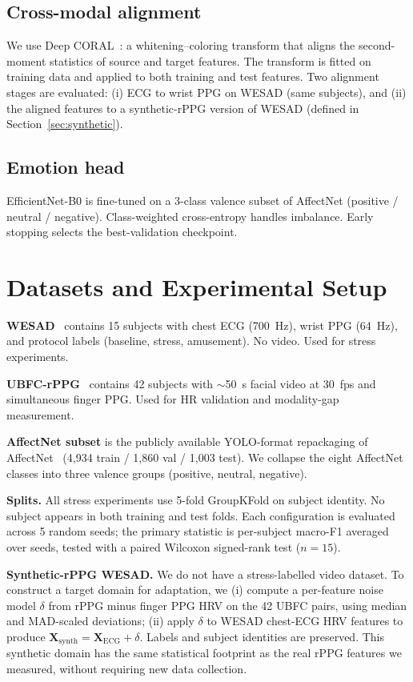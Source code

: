 \documentclass[conference]{IEEEtran}
\begin{document}
\subsection{Cross-modal alignment}
We use Deep CORAL~\cite{sun2016}: a whitening--coloring transform
that aligns the second-moment statistics of source and target
features. The transform is fitted on training data and applied to both
training and test features. Two alignment stages are evaluated: (i)
ECG to wrist PPG on WESAD (same subjects), and (ii) the aligned
features to a synthetic-rPPG version of WESAD (defined in
Section~\ref{sec:synthetic}).

\subsection{Emotion head}
EfficientNet-B0 is fine-tuned on a 3-class valence subset of
AffectNet (positive / neutral / negative). Class-weighted
cross-entropy handles imbalance. Early stopping selects the
best-validation checkpoint.

\section{Datasets and Experimental Setup}

\textbf{WESAD}~\cite{schmidt2018} contains 15 subjects with chest ECG
(700~Hz), wrist PPG (64~Hz), and protocol labels (baseline, stress,
amusement). No video. Used for stress experiments.

\textbf{UBFC-rPPG}~\cite{bobbia2019} contains 42 subjects with
$\sim$50~s facial video at 30~fps and simultaneous finger PPG. Used
for HR validation and modality-gap measurement.

\textbf{AffectNet subset} is the publicly available YOLO-format
repackaging of AffectNet~\cite{mollahosseini2019}
(4{,}934 train / 1{,}860 val / 1{,}003 test). We collapse the eight
AffectNet classes into three valence groups (positive, neutral,
negative).

\textbf{Splits.} All stress experiments use 5-fold GroupKFold on
subject identity. No subject appears in both training and test folds.
Each configuration is evaluated across 5 random seeds; the primary
statistic is per-subject macro-F1 averaged over seeds, tested with a
paired Wilcoxon signed-rank test ($n{=}15$).

\textbf{Synthetic-rPPG WESAD.}\label{sec:synthetic} We do not have a
stress-labelled video dataset. To construct a target domain for
adaptation, we (i) compute a per-feature noise model $\delta$ from
rPPG minus finger PPG HRV on the 42 UBFC pairs, using median and
MAD-scaled deviations; (ii) apply $\delta$ to WESAD chest-ECG HRV
features to produce $\mathbf{X}_{\text{synth}} = \mathbf{X}_{\text{ECG}}
+ \delta$. Labels and subject identities are preserved. This synthetic
domain has the same statistical footprint as the real rPPG features
we measured, without requiring new data collection.
\end{document}
